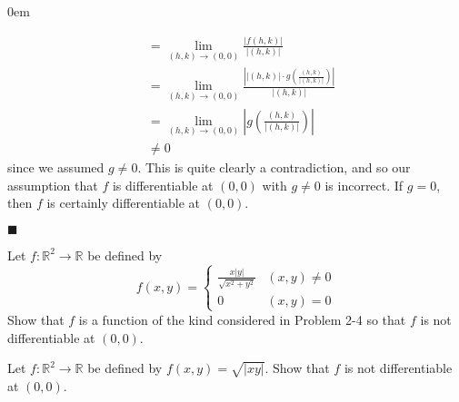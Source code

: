 \documentclass[12pt]{article}
\renewcommand{\qed}{\hfill$\blacksquare$}
\renewenvironment{proof}{\begin{addmargin}[1em]{0em}\begin{newproof}}{\end{newproof}\end{addmargin}\qed}
\newenvironment{problem}[2][Problem]{\begin{trivlist}
\item[\hskip \labelsep {\bfseries #1}\hskip \labelsep {\bfseries #2.}]}{\end{trivlist}}
\begin{document}
\begin{proof}
\begin{itemize}
\begin{equation*}
\begin{split}
& = \lim_{\left(h,k\right)\rightarrow \left(0,0\right)} \frac{\left| f\left(h,k\right) \right|}{\left| \left(h,k\right)\right|} \\
& = \lim_{\left(h,k\right)\rightarrow \left(0,0\right)} \frac{\left| \left|\left(h,k\right)\right| \cdot g\left( \frac{\left(h,k\right)}{\left| \left(h,k\right)\right|}\right) \right|}{\left| \left(h,k\right)\right|} \\
& = \lim_{\left(h,k\right)\rightarrow \left(0,0\right)} \left|  g\left( \frac{\left(h,k\right)}{\left| \left(h,k\right) \right|} \right) \right| \\
& \neq 0
\end{split}\end{equation*}
since we assumed $g\neq 0$. This is quite clearly a contradiction, and so our assumption that $f$ is differentiable at $\left(0,0\right)$ with $g\neq 0$ is incorrect. If $g=0$, then $f$ is certainly differentiable at $\left(0,0\right)$.

\end{itemize}
\end{proof}









\begin{problem}{2.5}
Let $f:\mathbb{R}^2 \rightarrow \mathbb{R}$ be defined by
\begin{equation*}
f\left(x,y\right) = \left\{ \begin{array}{lr} \frac{x\left|y\right|}{\sqrt{x^2+y^2}} & \left(x,y\right) \neq 0 \\ 0 & \left(x,y\right) =0 \end{array} \right.
\end{equation*}
Show that $f$ is a function of the kind considered in Problem 2-4 so that $f$ is not differentiable at $\left(0,0\right)$.
\end{problem}







\begin{problem}{2.6}
Let $f:\mathbb{R}^2\rightarrow \mathbb{R}$ be defined by $f\left(x,y\right) = \sqrt{\left|xy\right|}$. Show that $f$ is not differentiable at $\left(0,0\right)$.
\end{problem}
\end{document}
